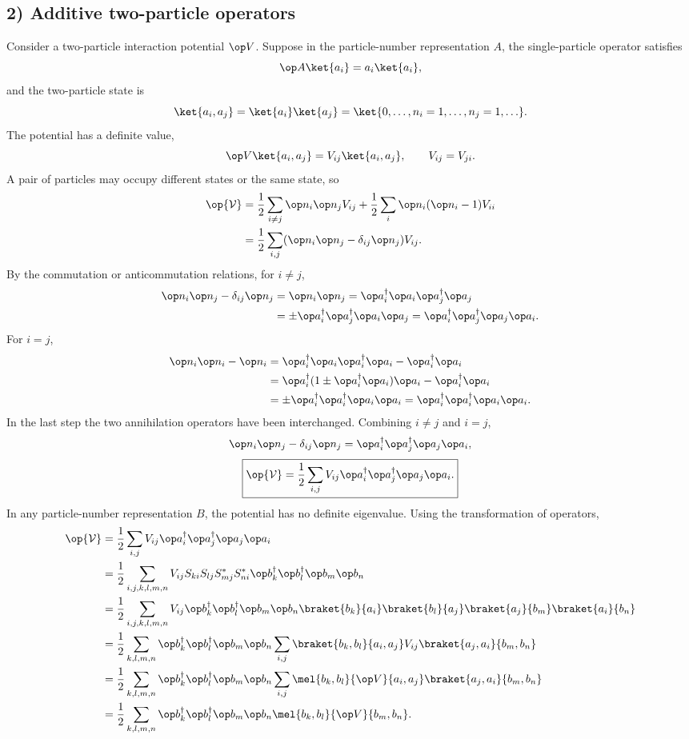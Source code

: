 \subsection*{2) Additive two-particle operators}
Consider a two-particle interaction potential $\op V$.
Suppose in the particle-number representation $A$, the single-particle operator satisfies
\[\op A\ket{a_i}=a_i\ket{a_i},\]
and the two-particle state is
\[\ket{a_i,a_j}=\ket{a_i}\ket{a_j}
=\ket{0,\ldots,n_i=1,\ldots,n_j=1,\ldots}.\]
The potential has a definite value,
\[\op V\ket{a_i,a_j}=V_{ij}\ket{a_i,a_j},\qquad V_{ij}=V_{ji}.\]
A pair of particles may occupy different states or the same state, so
\begin{align*}
\op{\mathcal V}
&=\frac12\sum_{i\ne j}\op n_i\op n_j V_{ij}
+\frac12\sum_i\op n_i(\op n_i-1)V_{ii}\\
&=\frac12\sum_{i,j}(\op n_i\op n_j-\delta_{ij}\op n_j)V_{ij}.
\end{align*}
By the commutation or anticommutation relations, for $i\ne j$,
\begin{align*}
\op n_i\op n_j-\delta_{ij}\op n_j
&=\op n_i\op n_j
=\op a_i^\dagger\op a_i\op a_j^\dagger\op a_j\\
&=\pm\op a_i^\dagger\op a_j^\dagger\op a_i\op a_j
=\op a_i^\dagger\op a_j^\dagger\op a_j\op a_i.
\end{align*}
For $i=j$,
\begin{align*}
\op n_i\op n_i-\op n_i
&=\op a_i^\dagger\op a_i\op a_i^\dagger\op a_i-\op a_i^\dagger\op a_i\\
&=\op a_i^\dagger(1\pm\op a_i^\dagger\op a_i)\op a_i-\op a_i^\dagger\op a_i\\
&=\pm\op a_i^\dagger\op a_i^\dagger\op a_i\op a_i
=\op a_i^\dagger\op a_i^\dagger\op a_i\op a_i.
\end{align*}
In the last step the two annihilation operators have been interchanged.
Combining $i\ne j$ and $i=j$,
\[\op n_i\op n_j-\delta_{ij}\op n_j
=\op a_i^\dagger\op a_j^\dagger\op a_j\op a_i,\]
\[\boxed{\op{\mathcal V}=\frac12\sum_{i,j}V_{ij}
\op a_i^\dagger\op a_j^\dagger\op a_j\op a_i.}\]
In any particle-number representation $B$, the potential has no definite eigenvalue. Using the transformation of operators,
\begin{align*}
\op{\mathcal V}
&=\frac12\sum_{i,j}V_{ij}\op a_i^\dagger\op a_j^\dagger\op a_j\op a_i\\
&=\frac12\sum_{i,j,k,l,m,n}V_{ij}S_{ki}S_{lj}S_{mj}^*S_{ni}^*
\op b_k^\dagger\op b_l^\dagger\op b_m\op b_n\\
&=\frac12\sum_{i,j,k,l,m,n}V_{ij}
\op b_k^\dagger\op b_l^\dagger\op b_m\op b_n
\braket{b_k}{a_i}\braket{b_l}{a_j}\braket{a_j}{b_m}\braket{a_i}{b_n}\\
&=\frac12\sum_{k,l,m,n}\op b_k^\dagger\op b_l^\dagger\op b_m\op b_n
\sum_{i,j}\braket{b_k,b_l}{a_i,a_j}
V_{ij}\braket{a_j,a_i}{b_m,b_n}\\
&=\frac12\sum_{k,l,m,n}\op b_k^\dagger\op b_l^\dagger\op b_m\op b_n
\sum_{i,j}\mel{b_k,b_l}{\op V}{a_i,a_j}
\braket{a_j,a_i}{b_m,b_n}\\
&=\frac12\sum_{k,l,m,n}
\op b_k^\dagger\op b_l^\dagger\op b_m\op b_n
\mel{b_k,b_l}{\op V}{b_m,b_n}.
\end{align*}
